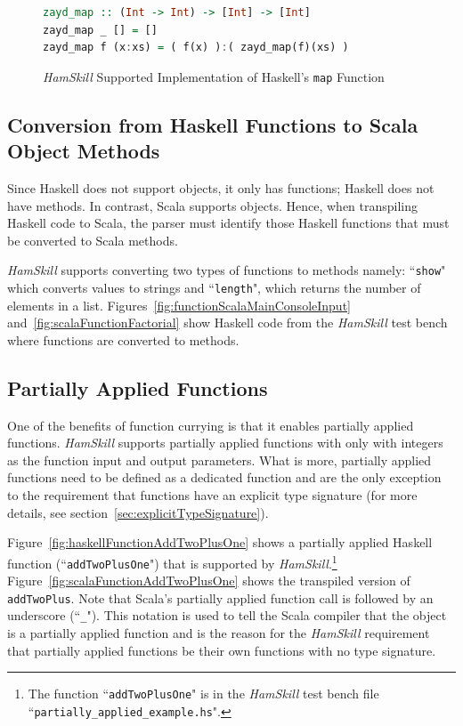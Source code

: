 \documentclass{report}
\begin{document}
\begin{figure}[H]
\begin{mdframed}
\begin{lstlisting}[language=Haskell]
zayd_map :: (Int -> Int) -> [Int] -> [Int]
zayd_map _ [] = []
zayd_map f (x:xs) = ( f(x) ):( zayd_map(f)(xs) )
\end{lstlisting}
\end{mdframed}
\caption{\textit{HamSkill} Supported Implementation of Haskell's \texttt{map} Function}\label{fig:haskellFunctionMap}
\end{figure}

\subsection{Conversion from Haskell Functions to Scala Object Methods}

Since Haskell does not support objects, it only has functions; Haskell does not have methods.  In contrast, Scala supports objects.  Hence, when transpiling Haskell code to Scala, the parser must identify those Haskell functions that must be converted to Scala methods.  

\textit{HamSkill} supports converting two types of functions to methods namely: ``\texttt{show}" which converts values to strings and ``\texttt{length}", which returns the number of elements in a list.  Figures~\ref{fig:functionScalaMainConsoleInput} and~\ref{fig:scalaFunctionFactorial} show Haskell code from the \textit{HamSkill} test bench where functions are converted to methods.

\subsection{Partially Applied Functions}\label{sec:partiallyAppliedFunctions}

One of the benefits of function currying is that it enables partially applied functions.  \textit{HamSkill} supports partially applied functions with only with integers as the function input and output parameters.  What is more, partially applied functions need to be defined as a dedicated function and are the only exception to the requirement that functions have an explicit type signature (for more details, see section~\ref{sec:explicitTypeSignature}).  

Figure~\ref{fig:haskellFunctionAddTwoPlusOne} shows a partially applied Haskell function (``\texttt{addTwoPlusOne}") that is supported by \textit{HamSkill}.\footnote{The function ``\texttt{addTwoPlusOne}" is in the \textit{HamSkill} test bench file ``\texttt{partially\_applied\_example.hs}".}  Figure~\ref{fig:scalaFunctionAddTwoPlusOne} shows the transpiled version of \texttt{addTwoPlus}.  Note that Scala's partially applied function call is followed by an underscore (``\texttt{\_}").  This notation is used to tell the Scala compiler that the object is a partially applied function and is the reason for the \textit{HamSkill} requirement that partially applied functions be their own functions with no type signature.
\end{document}
